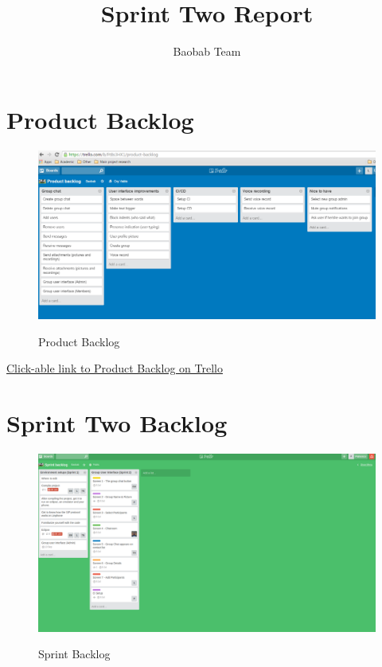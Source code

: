 \documentclass[a4paper]{article}
\title{Sprint Two Report}
\author{Baobab Team}
\begin{document}
\newpage


\newpage

\section{Product Backlog}

\begin{figure}[H]
\includegraphics[width=1\linewidth]{./pictures/backlog.jpg}\\
\caption{\label{fig:Product Backlog}Product Backlog}
\end{figure}

\href{https://trello.com/b/FtBs3HX1}{Click-able link to Product Backlog on Trello}
\newpage

\section{Sprint Two Backlog}

\begin{figure}[H]
\includegraphics[width=1\linewidth]{./pictures/sprintlog.png}\\
\caption{\label{fig:Sprint Backlog}Sprint Backlog}
\end{figure}
\end{document}
